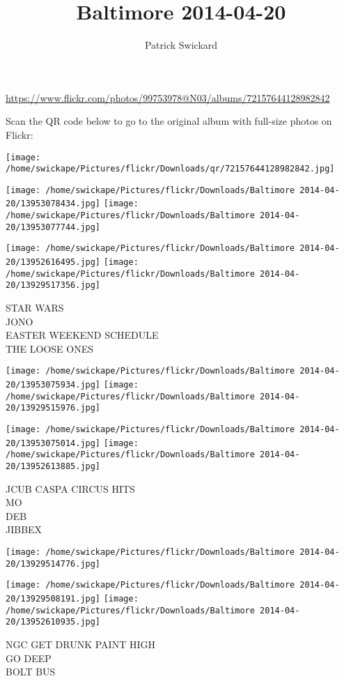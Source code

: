\documentclass[10pt,letterpaper]{article}
\title{Baltimore 2014-04-20}
\author{Patrick Swickard}
\date{}
\begin{document}
\maketitle

\url{https://www.flickr.com/photos/99753978@N03/albums/72157644128982842}

Scan the QR code below to go to the original album with full-size photos on Flickr:

\texttt{[image: /home/swickape/Pictures/flickr/Downloads/qr/72157644128982842.jpg]}
\pagebreak

\texttt{[image: /home/swickape/Pictures/flickr/Downloads/Baltimore 2014-04-20/13953078434.jpg]}
\texttt{[image: /home/swickape/Pictures/flickr/Downloads/Baltimore 2014-04-20/13953077744.jpg]}

\texttt{[image: /home/swickape/Pictures/flickr/Downloads/Baltimore 2014-04-20/13952616495.jpg]}
\texttt{[image: /home/swickape/Pictures/flickr/Downloads/Baltimore 2014-04-20/13929517356.jpg]}

STAR WARS\\
JONO\\
EASTER WEEKEND SCHEDULE\\
THE LOOSE ONES
\pagebreak

\texttt{[image: /home/swickape/Pictures/flickr/Downloads/Baltimore 2014-04-20/13953075934.jpg]}
\texttt{[image: /home/swickape/Pictures/flickr/Downloads/Baltimore 2014-04-20/13929515976.jpg]}

\texttt{[image: /home/swickape/Pictures/flickr/Downloads/Baltimore 2014-04-20/13953075014.jpg]}
\texttt{[image: /home/swickape/Pictures/flickr/Downloads/Baltimore 2014-04-20/13952613885.jpg]}

JCUB CASPA CIRCUS HITS\\
MO\\
DEB\\
JIBBEX
\pagebreak

\texttt{[image: /home/swickape/Pictures/flickr/Downloads/Baltimore 2014-04-20/13929514776.jpg]}

\vspace{0.25in}
\texttt{[image: /home/swickape/Pictures/flickr/Downloads/Baltimore 2014-04-20/13929508191.jpg]}
\texttt{[image: /home/swickape/Pictures/flickr/Downloads/Baltimore 2014-04-20/13952610935.jpg]}

NGC GET DRUNK PAINT HIGH\\
GO DEEP\\
BOLT BUS
\pagebreak
\end{document}

